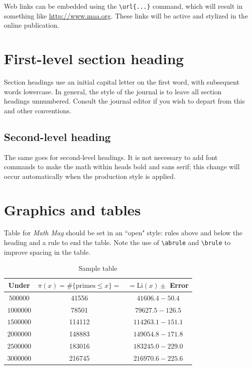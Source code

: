 \documentclass{article}
\theoremstyle{theorem}
\theoremstyle{definition}
\begin{document}
Web links can be embedded using the \verb~\url{...}~ command, which will result in something like \url{http://www.maa.org}.  These links will be active and stylized in the online publication.

\section{First-level section heading}

Section headings use an initial capital letter on the first word, with subsequent words lowercase.  In general, the style of the journal is to leave all section headings unnumbered.  Consult the journal editor if you wish to depart from this and other conventions.


\subsection{Second-level heading}

The same goes for second-level headings.  It is not necessary to add font commands to make the math within heads bold and sans serif; this change will occur automatically when the production style is applied.

\section{Graphics and tables}

Table for  \textit{Math Mag} should be set in an ``open" style: rules above and below the heading and a rule to end the table.  Note the use of \verb~\abrule~ and \verb~\brule~ to improve spacing in the table.

\begin{table}[h]
\begin{center}
\begin{tabular}{ccc}
\hline
Under  & $\pi(x) = \#\{\text{primes} \le x\}=$ &   $=\text{Li}(x)\pm$  Error\abrule\\
\hline
$500000$  &  41556 &  $41606.4 - 50.4$ \abrule \\
$1000000$ &  78501 &  $79627.5 - 126.5$\brule \\
$1500000$ & 114112 & $114263.1 - 151.1$\brule \\
$2000000$ & 148883 & $149054.8 - 171.8$\brule \\
$2500000$ & 183016 & $183245.0 - 229.0$\brule \\
$3000000$ & 216745 & $216970.6 - 225.6 $\brule \\
\hline
\end{tabular}
\end{center}
\caption{Sample table}
\end{table}
\end{document}
